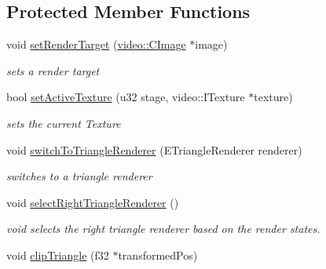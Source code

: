 \subsection*{Protected Member Functions}
\begin{DoxyCompactItemize}
\item 
\hypertarget{classirr_1_1video_1_1_c_software_driver_a712e19b90393459681d72d5d308318a6}{void \hyperlink{classirr_1_1video_1_1_c_software_driver_a712e19b90393459681d72d5d308318a6}{set\-Render\-Target} (\hyperlink{classirr_1_1video_1_1_c_image}{video\-::\-C\-Image} $\ast$image)}\label{classirr_1_1video_1_1_c_software_driver_a712e19b90393459681d72d5d308318a6}

\begin{DoxyCompactList}\small\item\em sets a render target \end{DoxyCompactList}\item 
\hypertarget{classirr_1_1video_1_1_c_software_driver_a5facd516f4e20509053a8f052dcd9544}{bool \hyperlink{classirr_1_1video_1_1_c_software_driver_a5facd516f4e20509053a8f052dcd9544}{set\-Active\-Texture} (u32 stage, video\-::\-I\-Texture $\ast$texture)}\label{classirr_1_1video_1_1_c_software_driver_a5facd516f4e20509053a8f052dcd9544}

\begin{DoxyCompactList}\small\item\em sets the current Texture \end{DoxyCompactList}\item 
\hypertarget{classirr_1_1video_1_1_c_software_driver_ab9a030a9837e80231bf46aad6bacdeb2}{void \hyperlink{classirr_1_1video_1_1_c_software_driver_ab9a030a9837e80231bf46aad6bacdeb2}{switch\-To\-Triangle\-Renderer} (E\-Triangle\-Renderer renderer)}\label{classirr_1_1video_1_1_c_software_driver_ab9a030a9837e80231bf46aad6bacdeb2}

\begin{DoxyCompactList}\small\item\em switches to a triangle renderer \end{DoxyCompactList}\item 
\hypertarget{classirr_1_1video_1_1_c_software_driver_a7b79eba95e9bdcae8fdd885137f796e4}{void \hyperlink{classirr_1_1video_1_1_c_software_driver_a7b79eba95e9bdcae8fdd885137f796e4}{select\-Right\-Triangle\-Renderer} ()}\label{classirr_1_1video_1_1_c_software_driver_a7b79eba95e9bdcae8fdd885137f796e4}

\begin{DoxyCompactList}\small\item\em void selects the right triangle renderer based on the render states. \end{DoxyCompactList}\item 
\hypertarget{classirr_1_1video_1_1_c_software_driver_a37763353f625e337795741146d697132}{void \hyperlink{classirr_1_1video_1_1_c_software_driver_a37763353f625e337795741146d697132}{clip\-Triangle} (f32 $\ast$transformed\-Pos)}\label{classirr_1_1video_1_1_c_software_driver_a37763353f625e337795741146d697132}


\end{DoxyCompactItemize}
